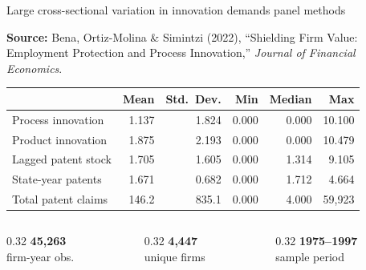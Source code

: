 \documentclass[aspectratio=169, 11pt]{beamer}
\begin{document}
\begin{frame}{Large cross-sectional variation in innovation demands panel methods}

\vspace{0.3cm}

\textbf{Source:} Bena, Ortiz-Molina \& Simintzi (2022), ``Shielding Firm Value:
Employment Protection and Process Innovation,'' \textit{Journal of Financial Economics}.

\vspace{0.4cm}

\begin{table}
\centering\small
\begin{tabular}{@{}lrrrrr@{}}
\toprule
& \textbf{Mean} & \textbf{Std.\ Dev.} & \textbf{Min} & \textbf{Median} & \textbf{Max} \\
\midrule
Process innovation      & 1.137 & 1.824 & 0.000 & 0.000 & 10.100 \\
Product innovation      & 1.875 & 2.193 & 0.000 & 0.000 & 10.479 \\
Lagged patent stock     & 1.705 & 1.605 & 0.000 & 1.314 &  9.105 \\
State-year patents      & 1.671 & 0.682 & 0.000 & 1.712 &  4.664 \\
Total patent claims     & 146.2 & 835.1 & 0.000 & 4.000 & 59{,}923 \\
\bottomrule
\end{tabular}
\end{table}

\vspace{0.3cm}

\begin{columns}[T]
\begin{column}{0.32\textwidth}
\centering
\textbf{45,263}\\[2pt]
{\small firm-year obs.}
\end{column}
\begin{column}{0.32\textwidth}
\centering
\textbf{4,447}\\[2pt]
{\small unique firms}
\end{column}
\begin{column}{0.32\textwidth}
\centering
\textbf{1975--1997}\\[2pt]
{\small sample period}
\end{column}
\end{columns}
\end{frame}
\end{document}
